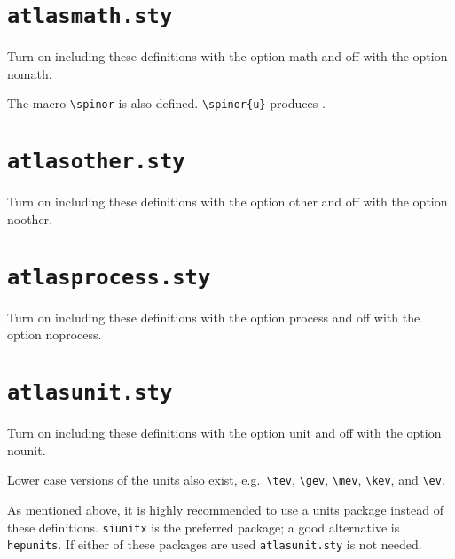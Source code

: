 \documentclass[koma,UKenglish]{latex/atlasdoc}
\newcommand{\File}[1]{\texttt{#1}\xspace}
\newcommand{\Macro}[1]{\texttt{\textbackslash #1}\xspace}
\newcommand{\Option}[1]{\textsf{#1}\xspace}
\newcommand{\Package}[1]{\texttt{#1}\xspace}
\begin{document}
{


\newpage
\section{\File{atlasmath.sty}}

Turn on including these definitions with the option \Option{math} and off with the option \Option{nomath}.



\noindent The macro \Macro{spinor} is also defined.
\verb|\spinor{u}| produces .


\newpage
\section{\File{atlasother.sty}}

Turn on including these definitions with the option \Option{other} and off with the option \Option{noother}.




\newpage
\section{\File{atlasprocess.sty}}

Turn on including these definitions with the option \Option{process} and off with the option \Option{noprocess}.




\newpage
\section{\File{atlasunit.sty}}

Turn on including these definitions with the option \Option{unit} and off with the option \Option{nounit}.



\noindent Lower case versions of the units also exist, e.g.\ \verb|\tev|, \verb|\gev|, \verb|\mev|, \verb|\kev|, and
\verb|\ev|. 

As mentioned above, it is highly recommended to use a units package instead of
these definitions. \Package{siunitx} is the preferred package; a good alternative is \Package{hepunits}.
If either of these packages are used \File{atlasunit.sty} is not needed.


}
\end{document}
